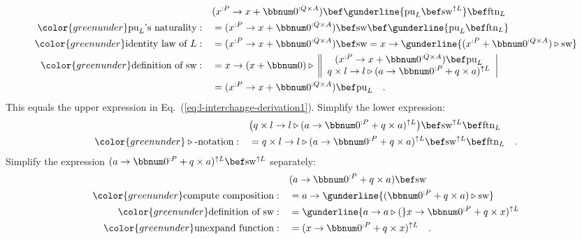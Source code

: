 \begin{align*}
 & (x^{:P}\rightarrow x+\bbnum 0^{:Q\times A})\bef\gunderline{\text{pu}_{L}\bef\text{sw}^{\uparrow L}}\bef\text{ftn}_{L}\\
{\color{greenunder}\text{pu}_{L}\text{\textsf{'}s naturality}:}\quad & =(x^{:P}\rightarrow x+\bbnum 0^{:Q\times A})\bef\text{sw}\bef\gunderline{\text{pu}_{L}\bef\text{ftn}_{L}}\\
{\color{greenunder}\text{identity law of }L:}\quad & =(x^{:P}\rightarrow x+\bbnum 0^{:Q\times A})\bef\text{sw}=x\rightarrow\gunderline{(x^{:P}+\bbnum 0^{:Q\times A})\triangleright\text{sw}}\\
{\color{greenunder}\text{definition of }\text{sw}:}\quad & =x\rightarrow(x+\bbnum 0)\triangleright\,\left\Vert \begin{array}{c}
(x^{:P}\rightarrow x+\bbnum 0^{:Q\times A})\bef\text{pu}_{L}\\
q\times l\rightarrow l\triangleright(a\rightarrow\bbnum 0^{:P}+q\times a)^{\uparrow L}
\end{array}\right|\\
 & =(x^{:P}\rightarrow x+\bbnum 0^{:Q\times A})\bef\text{pu}_{L}\quad.
\end{align*}
This equals the upper expression in Eq.~(\ref{eq:l-interchange-derivation1}).
Simplify the lower expression:
\begin{align}
 & \big(q\times l\rightarrow l\triangleright(a\rightarrow\bbnum 0^{:P}+q\times a)^{\uparrow L}\big)\bef\text{sw}^{\uparrow L}\bef\text{ftn}_{L}\nonumber \\
{\color{greenunder}\triangleright\text{-notation}:}\quad & =q\times l\rightarrow l\triangleright(a\rightarrow\bbnum 0^{:P}+q\times a)^{\uparrow L}\bef\text{sw}^{\uparrow L}\bef\text{ftn}_{L}\quad.\label{eq:l-interchange-simplify-2}
\end{align}
Simplify the expression $(a\rightarrow\bbnum 0^{:P}+q\times a)^{\uparrow L}\bef\text{sw}^{\uparrow L}$
separately:
\begin{align}
 & (a\rightarrow\bbnum 0^{:P}+q\times a)\bef\text{sw}\nonumber \\
{\color{greenunder}\text{compute composition}:}\quad & =a\rightarrow\gunderline{(\bbnum 0^{:P}+q\times a)\triangleright\text{sw}}\nonumber \\
{\color{greenunder}\text{definition of }\text{sw}:}\quad & =\gunderline{a\rightarrow a\triangleright(}x\rightarrow\bbnum 0^{:P}+q\times x)^{\uparrow L}\nonumber \\
{\color{greenunder}\text{unexpand function}:}\quad & =(x\rightarrow\bbnum 0^{:P}+q\times x)^{\uparrow L}\quad.\label{eq:l-interchange-simplify-3}
\end{align}
